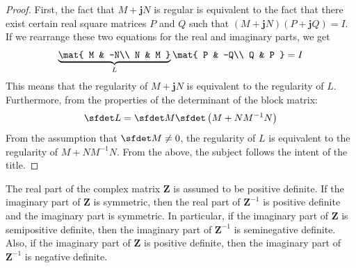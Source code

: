 \documentclass[graybox, envcountchap]{svmult}
\begin{document}
\begin{proof}
First, the fact that $M+ \bm{j} N$ is regular is equivalent to the fact that there exist certain real square matrices $P$ and $Q$ such that $(M+ \bm{j} N)(P+ \bm{j} Q)=I$.
If we rearrange these two equations for the real and imaginary parts, we get
\begin{equation}\label{eq:MNinv}
\underbrace{
\mat{
M & -N\\
N & M
}
}_{L}
\mat{
P & -Q\\
Q & P
}
=I
\end{equation}
This means that the regularity of $M+ \bm{j} N$ is equivalent to the regularity of $L$.
Furthermore, from the properties of the determinant of the block matrix:
\begin{align*}
\sfdet L =\sfdet M \sfdet \left(M+NM^{-1}N\right)
\end{align*}
From the assumption that $\sfdet M \neq 0$, the regularity of $L$ is equivalent to the regularity of $M+NM^{-1}N$.
From the above, the subject follows the intent of the title.
\end{proof}

 \begin{lemma}\label{lem:sdreim}
The real part of the complex matrix $\bm{Z}$ is assumed to be positive definite.
If the imaginary part of $\bm{Z}$ is symmetric, then the real part of $\bm{Z}^{-1}$ is positive definite and the imaginary part is symmetric.
In particular, if the imaginary part of $\bm{Z}$ is semipositive definite, then the imaginary part of $\bm{Z}^{-1}$ is seminegative definite.
Also, if the imaginary part of $\bm{Z}$ is positive definite, then the imaginary part of $\bm{Z}^{-1}$ is negative definite.
 \end{lemma}
\end{document}
